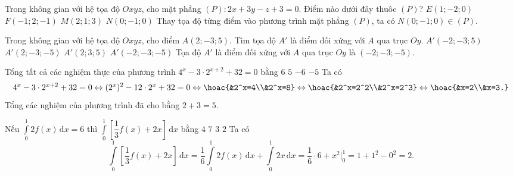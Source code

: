 \begin{ex}%
Trong không gian với hệ tọa độ $O x y z$, cho mặt phẳng $(P)\colon 2 x+3 y-z+3=0$. Điểm nào dưới đây thuôc $(P)$?
\choice
{$E(1 ;-2 ; 0)$}
{$F(-1 ; 2 ;-1)$}
{$M(2 ; 1 ; 3)$}
{\True $N(0 ;-1 ; 0)$}
\loigiai
{
Thay tọa độ từng điểm vào phương trình mặt phẳng $\left(P\right)$, ta có $N(0 ;-1 ; 0)\in\left(P\right)$.
}
\end{ex}

\begin{ex}%
Trong không gian với hệ tọa độ $O x y z$, cho điểm $A(2 ;-3 ; 5)$. Tìm tọa độ $A'$ là điểm đối xứng với $A$ qua trục $O y$.
\choice
{$A'(-2 ;-3 ; 5)$}
{$A'(2 ;-3 ;-5)$}
{$A'(2 ; 3 ; 5)$}
{\True $A'(-2 ;-3 ;-5)$}
\loigiai
{
Tọa độ $A'$ là điểm đối xứng với $A$ qua trục $O y$ là $\left(-2;-3;-5\right)$.
}
\end{ex}

\begin{ex}%
Tổng tất cả các nghiệm thực của phương trình $4^x-3\cdot 2^{x+2}+32=0$ bằng
\choice
{$6$}
{\True $5$}
{$-6$}
{$-5$}
\loigiai
{Ta có
\[4^x-3\cdot 2^{x+2}+32=0\Leftrightarrow (2^x)^2-12\cdot 2^x+32=0\Leftrightarrow\hoac{&2^x=4\\&2^x=8}\Leftrightarrow \hoac{&2^x=2^2\\&2^x=2^3}\Leftrightarrow\hoac{&x=2\\&x=3.}\]
Tổng các nghiệm của phương trình đã cho bằng $2+3=5$.
}
\end{ex}

\begin{ex}%
Nếu $\displaystyle\int\limits_0^1 2f(x)\mathrm{\,d}x=6$ thì $\displaystyle\int\limits_0^1\left[\dfrac{1}{3}f(x)+2x\right]\mathrm{\,d}x$ bằng
\choice
{$4$}
{$7$}
{$3$}
{\True $2$}
\loigiai
{Ta có
\[\displaystyle\int\limits_0^1\left[\dfrac{1}{3}f(x)+2x\right]\mathrm{\,d}x=\dfrac{1}{6}\displaystyle\int\limits_0^1 2f(x)\mathrm{\,d}x+\displaystyle\int\limits_0^1 2x\mathrm{\,d}x=\dfrac{1}{6}\cdot 6+x^2\Big|_0^1=1+1^2-0^2=2.\]
}
\end{ex}

